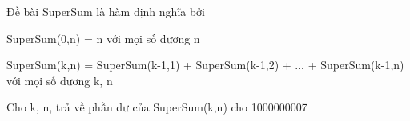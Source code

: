 Đề bài  
SuperSum là hàm định nghĩa bởi  

   SuperSum(0,n) = n với mọi số dương n  

   SuperSum(k,n) = SuperSum(k-1,1) + SuperSum(k-1,2) + ... + SuperSum(k-1,n) với mọi số dương k, n  

   Cho k, n, trả về phần dư của SuperSum(k,n) cho 1000000007